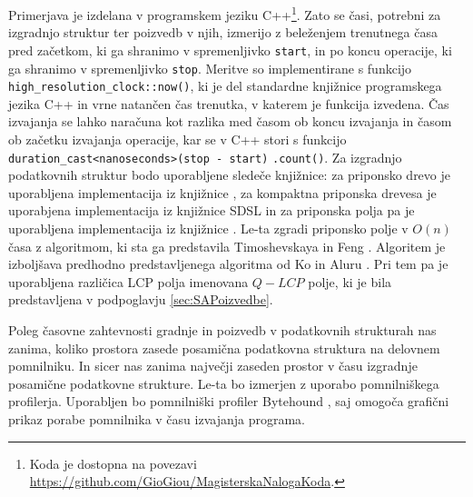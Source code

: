 Primerjava je izdelana v programskem jeziku C++\footnote{Koda je dostopna na povezavi \url{https://github.com/GioGiou/MagisterskaNalogaKoda}.}. Zato se časi, potrebni za izgradnjo struktur ter poizvedb v njih, izmerijo z beleženjem trenutnega časa pred začetkom, ki ga shranimo v spremenljivko \verb|start|, in po koncu operacije, ki ga shranimo v spremenljivko \verb|stop|. Meritve so implementirane s funkcijo \verb|high_resolution_clock::now()|, ki je del standardne knjižnice programskega jezika C++ in vrne natančen čas trenutka, v katerem je funkcija izvedena. Čas izvajanja se lahko naračuna kot razlika med časom ob koncu izvajanja in časom ob začetku izvajanja operacije, kar se v C++ stori s funkcijo \verb|duration_cast<nanoseconds>(stop - start)| \verb|.count()|. Za izgradnjo podatkovnih struktur bodo uporabljene sledeče knjižnice: za priponsko drevo je uporabljena implementacija iz knjižnice \cite{ganeshk13}, za kompaktna priponska drevesa je uporabjena implementacija iz knjižnice SDSL \cite{gbmp2014sea} in za priponska polja pa je uporabljena implementacija iz knjižnice \cite{Grebnov2025}. Le-ta zgradi priponsko polje v $O(n)$ časa z algoritmom, ki sta ga predstavila Timoshevskaya in Feng \cite{Timoshevskaya2014}. Algoritem je izboljšava predhodno predstavljenega algoritma od Ko in Aluru \cite{Ko2005}. Pri tem pa je uporabljena različica LCP polja imenovana $Q-LCP$ polje, ki je bila predstavljena v podpoglavju \ref{sec:SAPoizvedbe}.

Poleg časovne zahtevnosti gradnje in poizvedb v podatkovnih strukturah nas zanima, koliko prostora zasede posamična podatkovna struktura  na delovnem pomnilniku. In sicer nas zanima največji zaseden prostor v času izgradnje posamične podatkovne strukture. Le-ta bo izmerjen z uporabo pomnilniškega profilerja. Uporabljen bo pomnilniški profiler Bytehound \cite{Bytehound2024}, saj omogoča grafični prikaz porabe pomnilnika v času izvajanja programa.

